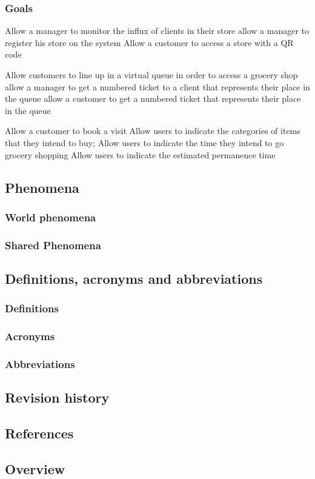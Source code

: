 \subsubsection{Goals}
\label{subsect:goals}

Allow a manager to monitor the influx of clients in their store 
allow a manager to register his store on the system
Allow a customer to access a store with a QR code

Allow customers to line up in a virtual queue in order to access a grocery shop
allow a manager to get a numbered ticket to a client that represents their place in the queue
allow a customer to get a numbered ticket that represents their place in the queue

Allow a customer to book a visit
Allow users to indicate the categories of items that they intend to buy;
Allow users to indicate the time they intend to go grocery shopping
Allow users to indicate the estimated permanence time 

\subsection{Phenomena}
\label{subsect:phenomena}

\subsubsection{World phenomena}
\label{subsubsect:worldphenomena}

\subsubsection{Shared Phenomena}
\label{subsubsect:sharedphenomena}

\subsection{Definitions, acronyms and abbreviations}
\label{subsect:definitionsacronymsabbreviations}

\subsubsection{Definitions}
\label{subsect:definitions}

\subsubsection{Acronyms}
\label{subsect:acronyms}

\subsubsection{Abbreviations}
\label{subsect:abbreviations}

\subsection{Revision history}
\label{subsect:revisionhistory}

\subsection{References}
\label{subsect:references}

\subsection{Overview}
\label{subsect:overview}
